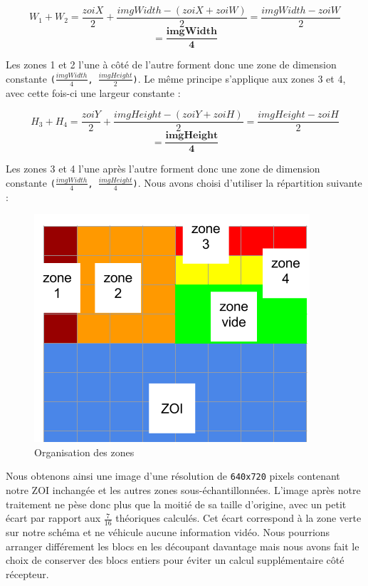 \documentclass[11pt,a4paper]{article}
\begin{document}
$$ W_1 + W_2 = \frac{zoiX}{2} + \frac{imgWidth-(zoiX+zoiW)}{2} = \frac{imgWidth - zoiW}{2}$$
$$ = \mathbf{\frac{imgWidth}{4}} $$

\bigbreak
Les zones 1 et 2 l'une à côté de l'autre forment donc une zone de dimension constante \texttt{($\frac{imgWidth}{4}$, $\frac{imgHeight}{2}$)}.
Le même principe s'applique aux zones 3 et 4, avec cette fois-ci une largeur constante :

$$ H_3 + H_4 = \frac{zoiY}{2} + \frac{imgHeight-(zoiY+zoiH)}{2} = \frac{imgHeight - zoiH}{2} $$
$$ = \mathbf{\frac{imgHeight}{4}} $$

\bigbreak
Les zones 3 et 4 l'une après l'autre forment donc une zone de dimension constante \texttt{($\frac{imgWidth}{4}$, $\frac{imgHeight}{4}$)}.
Nous avons choisi d'utiliser la répartition suivante :

\begin{figure}[H]
\begin{center}
\includegraphics[scale=0.4]{images/decoupage2.png}
\end{center}
\caption{Organisation des zones}
\label{}
\end{figure}

\bigbreak
Nous obtenons ainsi une image d'une résolution de \texttt{640x720} pixels contenant notre ZOI inchangée et les autres zones sous-échantillonnées.
L'image après notre traitement ne pèse donc plus que la moitié de sa taille d'origine, avec un petit écart par rapport aux $\frac{7}{16}$ théoriques calculés.
Cet écart correspond à la zone verte sur notre schéma et ne véhicule aucune information vidéo.
Nous pourrions arranger différement les blocs en les découpant davantage mais nous avons fait le choix de conserver des blocs entiers pour éviter un calcul supplémentaire côté récepteur.
\end{document}
